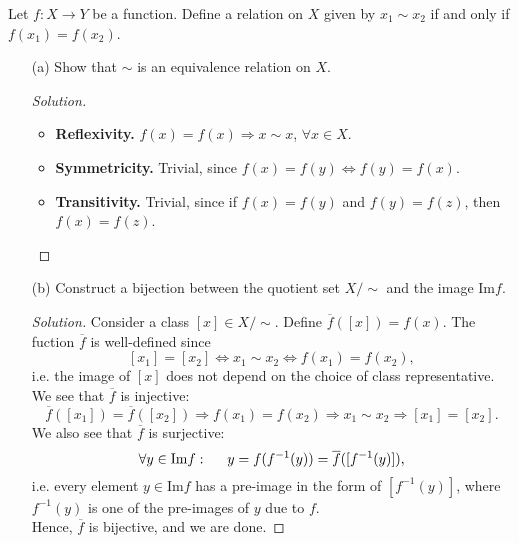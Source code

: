 \begin{problem}
    Let $f \colon X \to Y$ be a function. Define a relation on $X$ given by $x_1 \sim x_2$ if and only if $f(x_1) = f(x_2)$.
    \begin{enumerate}
        \item[(a)] Show that $\sim$ is an equivalence relation on $X$.
            \begin{proof}[Solution]~
                \begin{itemize}
                    \item \textbf{Reflexivity.}
                        $f(x) = f(x) \Longrightarrow x \sim x$, $\forall x \in X$.
                    \item \textbf{Symmetricity.}
                        Trivial, since $f(x) = f(y) \Longleftrightarrow f(y) = f(x)$.
                    \item \textbf{Transitivity.} Trivial, since if $f(x) = f(y)$ and $f(y) = f(z)$, then $f(x) = f(z)$.
                \end{itemize}
            \end{proof}
        \item[(b)] Construct a bijection between the quotient set $X/\sim$ and the image $\mathrm{Im} f$.
            \begin{proof}[Solution]
                Consider a class $[x] \in X/\sim$. Define $\overline{f}([x]) = f(x)$. The fuction $\overline{f}$ is well-defined since
                \[
                    [x_1] = [x_2] \Longleftrightarrow x_1 \sim x_2 \Longleftrightarrow f(x_1) = f(x_2),
                \]
                i.e. the image of $[x]$ does not depend on the choice of class representative.\\
                We see that $\overline{f}$ is injective:
                \[ \overline{f}([x_1]) = \overline{f}([x_2]) \Longrightarrow f(x_1) = f(x_2) \Longrightarrow x_1 \sim x_2 \Longrightarrow [x_1] = [x_2]. \]
                We also see that $\overline{f}$ is surjective:
                \[ \forall y \in \mathrm{Im} f: \hspace{0.5cm} y = f(f^{-1}(y)) = \overline{f}([f^{-1}(y)]), \]
                i.e. every element $y \in \mathrm{Im} f$ has a pre-image in the form of $[f^{-1}(y)]$, where $f^{-1}(y)$ is one of the pre-images of $y$ due to $f$.\\
                Hence, $\overline{f}$ is bijective, and we are done.
            \end{proof}
    \end{enumerate}
\end{problem}

